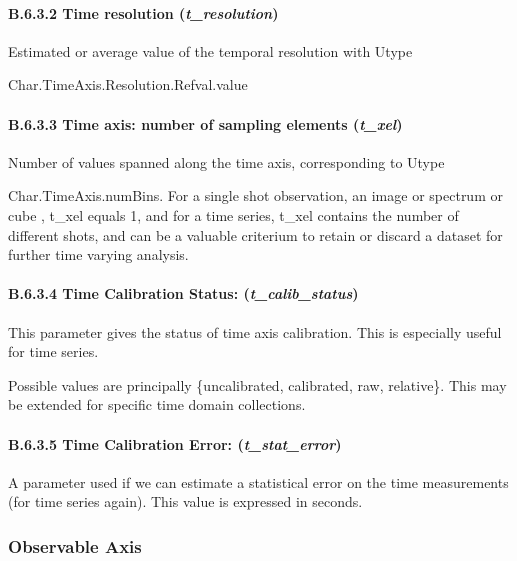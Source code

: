 \documentclass[11pt,a4paper]{ivoa}
\begin{document}
\paragraph{B.6.3.2 Time resolution (\emph{t\_resolution})}
Estimated or average value of the temporal resolution with Utype

Char.TimeAxis.Resolution.Refval.value

\paragraph{B.6.3.3 Time axis: number of sampling elements (\emph{t\_xel})}
Number of values spanned along the time axis, corresponding to Utype

Char.TimeAxis.numBins. For a single shot observation, an image or spectrum or cube , t\_xel equals 1, and for a  time
series, t\_xel contains the number of different shots, and can be a valuable criterium to retain or discard a dataset
for further time varying analysis.

\paragraph{B.6.3.4 Time Calibration Status: (\emph{t\_calib\_status})}
This parameter gives the status of time axis calibration. This is especially useful for time series.

Possible values are principally \{uncalibrated, calibrated, raw, relative\}. This may be extended for specific time
domain collections.

\paragraph{B.6.3.5 Time Calibration Error: (\emph{t\_stat\_error})}
A parameter used if we can estimate a statistical error on the time measurements (for time series again). This value is
expressed in seconds.

\subsubsection{Observable Axis}

\end{document}
